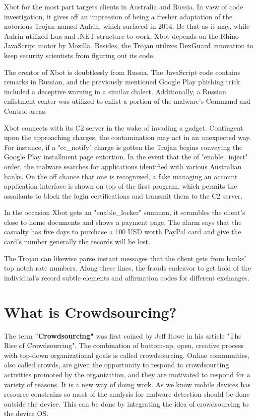 Xbot for the most part targets clients in Australia and Russia. In view of code investigation, it gives off an impression of being a fresher adaptation of the notorious Trojan named Aulrin, which surfaced in 2014. Be that as it may, while Aulrin utilized Lua and .NET structure to work, Xbot depends on the Rhino JavaScript motor by Mozilla. Besides, the Trojan utilizes DexGuard innovation to keep security scientists from figuring out its code. 

The creator of Xbot is doubtlessly from Russia. The JavaScript code contains remarks in Russian, and the previously mentioned Google Play phishing trick included a deceptive warning in a similar dialect. Additionally, a Russian enlistment center was utilized to enlist a portion of the malware's Command and Control areas. 

Xbot connects with its C2 server in the wake of invading a gadget. Contingent upon the approaching charges, the contamination may act in an unexpected way. For instance, if a "cc\_notify" charge is gotten the Trojan begins conveying the Google Play installment page extortion. In the event that the of "enable\_inject" order, the malware searches for applications identified with various Australian banks. On the off chance that one is recognized, a fake managing an account application interface is shown on top of the first program, which permits the assailants to block the login certifications and transmit them to the C2 server. 

In the occasion Xbot gets an "enable\_locker" summon, it scrambles the client's close to home documents and shows a payment page. The alarm says that the casualty has five days to purchase a 100 USD worth PayPal card and give the card's number generally the records will be lost. 

The Trojan can likewise parse instant messages that the client gets from banks' top notch rate numbers. Along these lines, the frauds endeavor to get hold of the individual's record subtle elements and affirmation codes for different exchanges.

\section{What is Crowdsourcing?}

\par The term \textbf{"Crowdsourcing"}\cite{brabham2013crowdsourcing} was first coined by Jeff Howe in his article "The Rise of Crowdsourcing". 
The combination of bottom-up, open, creative process with top-down organizational goals is called crowdsourcing.
Online communities, also called crowds, are given the opportunity to respond to crowdsourcing activities promoted by the organization, and they are motivated
to respond for a variety of reasons. 
It is a new way of doing work.
As we know mobile devices has resource constrains so most of the analysis for malware detection should be done outside the device. 
This can be done by integrating the idea of crowdsourcing to the device OS.
